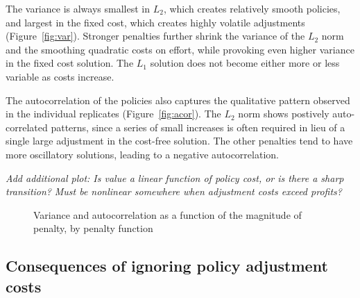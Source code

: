 \documentclass[authoryear, review, 12pt]{elsarticle}
\newcommand{\cdb}[1]{{\it \color{darkgreen} #1}}
\newcommand{\pa}[1]{{\it \color{darkblue} #1}}
\begin{document}
The variance is always smallest in $L_2$, which creates relatively smooth policies, and largest in the fixed cost, which creates highly volatile adjustments (Figure~\ref{fig:var}).  Stronger penalties further shrink the variance of the $L_2$ norm and the smoothing quadratic costs on effort, while provoking even higher variance in the fixed cost solution.  The $L_1$ solution does not become either more or less variable as costs increase.  

The autocorrelation of the policies also captures the qualitative pattern observed in the individual replicates (Figure~\ref{fig:acor}).  The $L_2$ norm shows postively auto-correlated patterns, since a series of small increases is often required in lieu of a single large adjustment in the cost-free solution.  The other penalties tend to have more oscillatory solutions, leading to a negative autocorrelation.  



\cdb{Add additional plot: Is value a linear function of policy cost, or is there a sharp transition? }
\pa{ Must be nonlinear somewhere when adjustment costs exceed profits? }




\begin{figure}
  \begin{center}
    \caption{Variance and autocorrelation as a function of the magnitude of penalty, by penalty function}\label{fig:summarystats}
  \end{center}
\end{figure}


\subsection{Consequences of ignoring policy adjustment costs}
\end{document}
